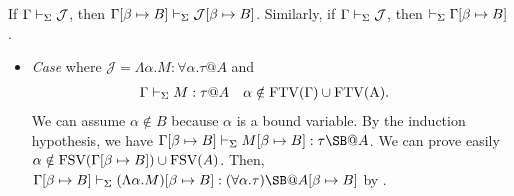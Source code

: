 \begin{lemma}
	If $\Gamma \vdash_\Sigma \mathcal{J}$, then $\Gamma[\beta\mapsto B] \vdash_\Sigma \mathcal{J}[\beta\mapsto B]$.  Similarly, if $\Gamma \vdash_\Sigma \mathcal{J}$, then $\vdash_\Sigma \Gamma[\beta\mapsto B]$.
\end{lemma}


\begin{itemize}
				
	\newcommand{\SB}{[\beta \mapsto B]}
	\newcommand{\GG}{\G\SB}
	\newcommand{\GGV}{\G\SB \V}

	\item \textit{Case} \TGen{} where $\mathcal{J} = \Lambda\alpha.M:\forall\alpha.\tau@A$ and
	\begin{align*}
    	& \G\V M:\tau@A && \alpha\notin\rm{FTV}(\G)\cup\rm{FTV}(A).
	\end{align*}
	We can assume $\alpha \notin B$ because $\alpha$ is a bound variable.
	By the induction hypothesis, we have \(\G\SB\V M\SB:\tau\SB@A\).
	We can prove easily $\alpha \notin \FTV(\GG) \cup \FTV(A)$.
	Then, \(\GGV (\Lambda\alpha.M)\SB:(\forall\alpha.\tau)\SB@A\SB\) by \TGen.


\end{itemize}

